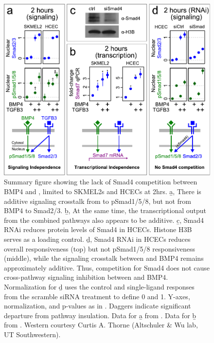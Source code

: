   \begin{figure}[!bt]
  \centering
  \includegraphics[width=5in]{FIGS/insulation/bmpTgfb_summary.pdf}
  {\singlespacing 
  \caption[BMP4 and \tgf\ do not compete for Smad4 (summary).]
        { Summary figure showing the lack of Smad4 competition between BMP4 and ,
          limited to SKMEL2s and HCECs at 2hrs.
          \b{a}, There is additive signaling crosstalk from  to
          pSmad1/5/8, but not from BMP4 to Smad2/3.
          \b{b}, At the same time, the transcriptional output from the combined
          pathways also appears to be additive.
          \b{c}, Smad4 RNAi reduces protein levels of Smad4 in HCECs.
          Histone H3B serves as a loading control. 
          \b{d}, Smad4 RNAi in HCECs reduces overall  responsiveness (top)
          but not pSmad1/5/8 responsiveness (middle), while the signaling
          crosstalk between  and BMP4 remains approximately
          additive. Thus, competition for Smad4 does not cause cross-pathway
          signaling inhibition between  and BMP4. Normalization
          for \b{d} uses the control and single-ligand responses from
          the scramble siRNA treatment to define 0 and 1.
          Y-axes, normalization, and
          p-values as in . Daggers
          indicate significant departure from pathway insulation.
          Data for \b{a} from .
          Data for \b{b} from .
          Western courtesy Curtis A. Thorne (Altschuler \& Wu lab, UT
          Southwestern).
          }
  \label{fig:insulation:bmpTgfbSummary}}
  \end{figure}
    

